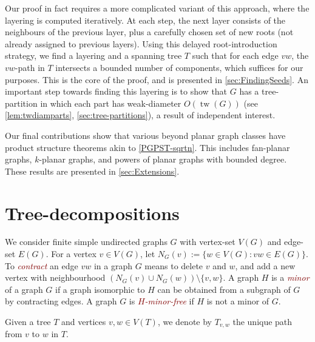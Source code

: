 \documentclass[11pt]{article}
\newcommand{\defn}[1]{\textcolor{Maroon}{\emph{#1}}}
\DeclareMathOperator{\tw}{tw}
\theoremstyle{plain}
\theoremstyle{definition}
\begin{document}
    Our proof in fact requires a more complicated variant of this approach, where the layering is computed iteratively. At each step, the next layer consists of the neighbours of the previous layer, plus a carefully chosen set of new roots (not already assigned to previous layers). 
    Using this delayed root-introduction strategy, we find a layering and a spanning tree $T$ such that for each edge $vw$, the $vw$-path in $T$ intersects a bounded number of components, which suffices for our purposes.
    This is the core of the proof, and is presented in \cref{sec:FindingSeeds}.
    An important step towards finding this layering is to show that $G$ has a tree-partition in which each part has weak-diameter $O(\tw(G))$ (see \cref{lem:twdiamparts}, \cref{sec:tree-partitions}), a result of independent interest. 

Our final contributions show that various beyond planar graph classes have product structure theorems akin to \cref{PGPST-sqrtn}. This includes fan-planar graphs, $k$-planar graphs, and powers of planar graphs with bounded degree. These results are presented in \cref{sec:Extensions}.
    
\section{Tree-decompositions}
\label{sec:TreeDecompositions}
	
	We consider finite simple undirected graphs $G$ with vertex-set $V(G)$ and edge-set $E(G)$. For a vertex $v\in V(G)$, let $N_G(v):=\{w\in V(G): vw\in E(G)\}$.
	To \defn{contract} an edge $vw$ in a graph $G$ means to delete $v$ and $w$, and add a new vertex with neighbourhood $(N_G(v)\cup N_G(w))\setminus\{v,w\}$. 
		A graph $H$ is a \defn{minor} of a graph $G$ if a graph isomorphic to $H$ can be obtained from a subgraph of $G$ by contracting edges. A graph $G$ is \defn{$H$-minor-free} if $H$ is not a minor of $G$. 
		
		Given a tree $T$ and vertices $v,w\in V(T)$, we denote by $T_{v,w}$ the unique path from $v$ to $w$ in $T$.
		
\end{document}
